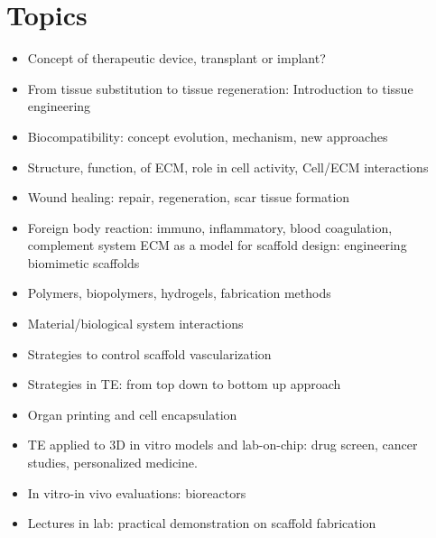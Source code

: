   \section{Topics}
    \begin{itemize}
      \item Concept of therapeutic device, transplant or implant?
      \item From tissue substitution to tissue regeneration: Introduction to tissue engineering
      \item Biocompatibility: concept evolution, mechanism, new approaches
      \item Structure, function, of ECM, role in cell activity, Cell/ECM interactions
      \item Wound healing: repair, regeneration, scar tissue formation
      \item Foreign body reaction: immuno, inflammatory, blood coagulation, complement system ECM as a model for scaffold design: engineering biomimetic scaffolds
      \item Polymers, biopolymers, hydrogels, fabrication methods
      \item Material/biological system interactions
      \item Strategies to control scaffold vascularization
      \item Strategies in TE: from top down to bottom up approach
      \item Organ printing and cell encapsulation
      \item TE applied to 3D in vitro models and lab-on-chip: drug screen, cancer studies, personalized medicine.
      \item In vitro-in vivo evaluations: bioreactors
      \item Lectures in lab: practical demonstration on scaffold fabrication
    \end{itemize}